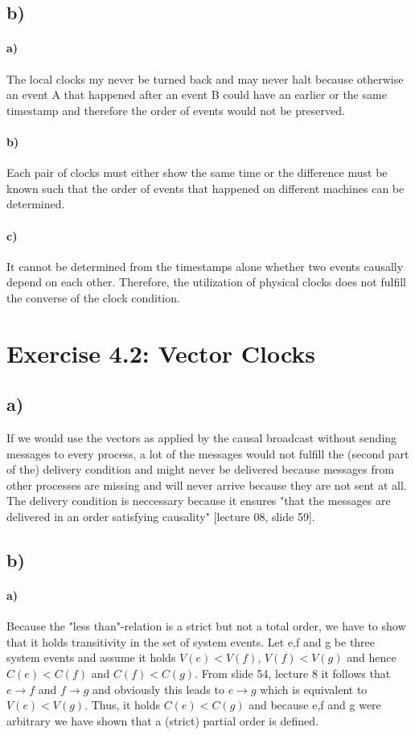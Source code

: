 \documentclass[12pt,a4paper]{article}
\begin{document}
  \subsection*{b)} %
    \paragraph{a)} The local clocks my never be turned back and may never halt because otherwise an event A that happened after an event B could have an earlier or the same timestamp and therefore the order of events would not be preserved.
  	\paragraph{b)} Each pair of clocks must either show the same time or the difference must be known such that the order of events that happened on different machines can be determined.
  	\paragraph{c)} It cannot be determined from the timestamps alone whether two events causally depend on each other. Therefore, the utilization of physical clocks does not fulfill the converse of the clock condition.
  	
\section{Exercise 4.2: Vector Clocks}
	\subsection*{a)} %
	If we would use the vectors as applied by the causal broadcast without sending messages to every process, a lot of the messages would not fulfill the (second part of the) delivery condition and might never be delivered because messages from other processes are missing and will never arrive because they are not sent at all. The delivery condition is neccessary because it ensures "that the messages are delivered in an order
	satisfying causality" [lecture 08, slide 59].
	\subsection*{b)} %
		\paragraph{a)} Because the "less than"-relation is a strict but not a total order, we have to show that it holds transitivity in the set of system events. Let e,f and g be three system events and assume it holds $V(e)<V(f)$, $V(f)<V(g)$ and hence $C(e)<C(f)$ and $C(f)<C(g)$. From slide 54, lecture 8 it follows that $e \rightarrow f$ and $f \rightarrow g$ and obviously this leads to $e \rightarrow g$ which is equivalent to $V(e)<V(g)$. Thus, it holds $C(e)<C(g)$ and because e,f and g were arbitrary we have shown that a (strict) partial order is defined.
\end{document}
